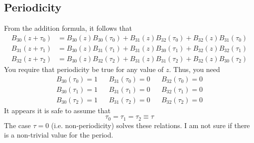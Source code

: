 \subsection{Periodicity}
From the addition formula, it follows that
\begin{align}
    B_{30}\left(z + \tau_{0}\right) &= B_{30}(z) B_{30}(\tau_{0}) + B_{31}(z) B_{32}(\tau_{0}) + B_{32}(z) B_{31}(\tau_{0}) \\
    B_{31}\left(z + \tau_{1}\right) &= B_{30}(z) B_{31}(\tau_{1}) + B_{31}(z) B_{30}(\tau_{1}) + B_{32}(z) B_{32}(\tau_{1}) \\
    B_{32}\left(z + \tau_{2}\right) &= B_{30}(z) B_{32}(\tau_{2}) + B_{31}(z) B_{31}(\tau_{2}) + B_{32}(z) B_{30}(\tau_{2})
\end{align}
You require that periodicity be true for any value of $z$. Thus, you need
\begin{align}
    B_{30}(\tau_{0}) = 1 && B_{31}(\tau_{0}) = 0 && B_{32}(\tau_{0}) = 0 \\
    B_{30}(\tau_{1}) = 1 && B_{31}(\tau_{1}) = 0 && B_{32}(\tau_{1}) = 0 \\
    B_{30}(\tau_{2}) = 1 && B_{31}(\tau_{2}) = 0 && B_{32}(\tau_{2}) = 0
\end{align}
It appears it is safe to assume that
\begin{equation}
    \tau_{0} = \tau_{1} = \tau_{2} \equiv \tau
\end{equation}
The case $\tau = 0$ (i.e. non-periodicity) solves these relations. I am not sure if there is a non-trivial value for the period.

